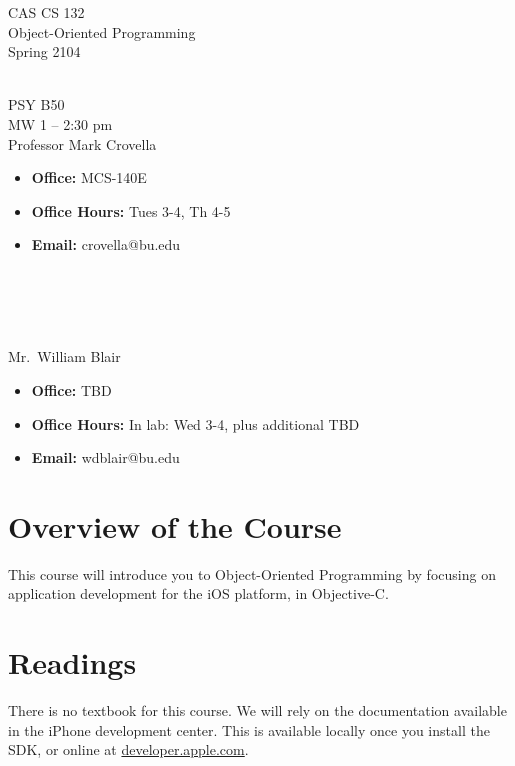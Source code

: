 \documentclass[11pt]{article}
\begin{document}
\begin{center}
\LARGE CAS CS 132\\
\Large Object-Oriented Programming\\
\Large\rm Spring 2104\\~\\
\end{center}

 PSY B50\\[\baselineskip]
 MW 1 -- 2:30 pm 
\\[\baselineskip] 

 Professor Mark Crovella\\[0.75\baselineskip]
\begin{minipage}[t]{0.60\textwidth}
\begin{itemize}
\item {\bf Office:} MCS-140E
\item {\bf Office Hours:} {\small Tues 3-4, Th 4-5}
\item {\bf Email:} crovella@bu.edu
\end{itemize}
\end{minipage}
~\\~\\~\\~\\
  Mr.\ William Blair\\[0.75\baselineskip]
 \begin{minipage}[t]{0.60\textwidth}
 \begin{itemize}
 \item {\bf Office:} TBD
 \item {\bf Office Hours:} {\small In lab: Wed 3-4, plus additional TBD}
 \item {\bf Email:} wdblair@bu.edu
 \end{itemize}
 \end{minipage}

\section*{Overview of the Course}

This course will introduce you to Object-Oriented Programming by focusing on application development for the iOS platform, in Objective-C.

\section*{Readings} 
There is no textbook for this course.  We will rely on the documentation
available in the iPhone development center.   This is available locally
once you install the SDK, or online at \url{developer.apple.com}.
\end{document}
